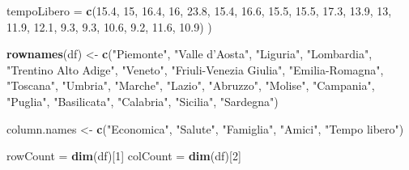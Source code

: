 \documentclass[]{book}
\newenvironment{Shaded}{\begin{snugshade}}{\end{snugshade}}
\newcommand{\KeywordTok}[1]{\textcolor[rgb]{0.13,0.29,0.53}{\textbf{#1}}}
\newcommand{\DataTypeTok}[1]{\textcolor[rgb]{0.13,0.29,0.53}{#1}}
\newcommand{\DecValTok}[1]{\textcolor[rgb]{0.00,0.00,0.81}{#1}}
\newcommand{\FloatTok}[1]{\textcolor[rgb]{0.00,0.00,0.81}{#1}}
\newcommand{\StringTok}[1]{\textcolor[rgb]{0.31,0.60,0.02}{#1}}
\newcommand{\NormalTok}[1]{#1}
\begin{document}
\begin{Shaded}
\begin{Highlighting}[]
  \DataTypeTok{tempoLibero =} \KeywordTok{c}\NormalTok{(}\FloatTok{15.4}\NormalTok{, }\DecValTok{15}\NormalTok{, }\FloatTok{16.4}\NormalTok{, }\DecValTok{16}\NormalTok{, }\FloatTok{23.8}\NormalTok{, }\FloatTok{15.4}\NormalTok{, }\FloatTok{16.6}\NormalTok{, }\FloatTok{15.5}\NormalTok{, }\FloatTok{15.5}\NormalTok{, }\FloatTok{17.3}\NormalTok{, }
                  \FloatTok{13.9}\NormalTok{, }\DecValTok{13}\NormalTok{, }\FloatTok{11.9}\NormalTok{, }\FloatTok{12.1}\NormalTok{, }\FloatTok{9.3}\NormalTok{, }\FloatTok{9.3}\NormalTok{, }\FloatTok{10.6}\NormalTok{, }\FloatTok{9.2}\NormalTok{, }\FloatTok{11.6}\NormalTok{, }\FloatTok{10.9}\NormalTok{)}
\NormalTok{)}

\KeywordTok{rownames}\NormalTok{(df) <-}\StringTok{ }\KeywordTok{c}\NormalTok{(}\StringTok{"Piemonte"}\NormalTok{, }\StringTok{"Valle d'Aosta"}\NormalTok{, }\StringTok{"Liguria"}\NormalTok{, }\StringTok{"Lombardia"}\NormalTok{, }
                  \StringTok{"Trentino Alto Adige"}\NormalTok{, }\StringTok{"Veneto"}\NormalTok{, }\StringTok{"Friuli-Venezia Giulia"}\NormalTok{,}
                  \StringTok{"Emilia-Romagna"}\NormalTok{, }\StringTok{"Toscana"}\NormalTok{, }\StringTok{"Umbria"}\NormalTok{, }\StringTok{"Marche"}\NormalTok{, }\StringTok{"Lazio"}\NormalTok{,}
                  \StringTok{"Abruzzo"}\NormalTok{, }\StringTok{"Molise"}\NormalTok{, }\StringTok{"Campania"}\NormalTok{, }\StringTok{"Puglia"}\NormalTok{, }\StringTok{"Basilicata"}\NormalTok{,}
                  \StringTok{"Calabria"}\NormalTok{, }\StringTok{"Sicilia"}\NormalTok{, }\StringTok{"Sardegna"}\NormalTok{)}
\end{Highlighting}
\end{Shaded}

\begin{Shaded}
\begin{Highlighting}[]
\NormalTok{column.names <-}\StringTok{ }\KeywordTok{c}\NormalTok{(}\StringTok{"Economica"}\NormalTok{, }\StringTok{"Salute"}\NormalTok{, }\StringTok{"Famiglia"}\NormalTok{, }\StringTok{"Amici"}\NormalTok{, }\StringTok{"Tempo libero"}\NormalTok{)}

\NormalTok{rowCount =}\StringTok{ }\KeywordTok{dim}\NormalTok{(df)[}\DecValTok{1}\NormalTok{]}
\NormalTok{colCount =}\StringTok{ }\KeywordTok{dim}\NormalTok{(df)[}\DecValTok{2}\NormalTok{]}
\end{Highlighting}
\end{Shaded}
\end{document}
